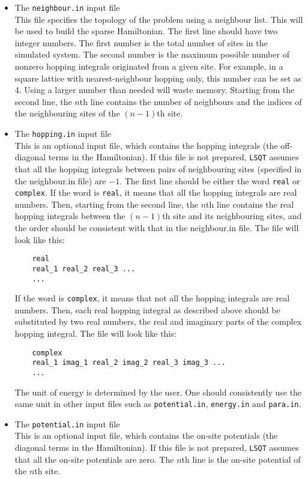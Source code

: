 \documentclass[12pt,a4paper]{report}
\begin{document}
\begin{itemize}
\item The \verb"neighbour.in" input file\\
This file specifies the topology of the problem using a neighbour list. This will be used to build the sparse Hamiltonian. The first line should have two integer numbers. The first number is the total number of sites in the simulated system. The second number is the maximum possible number of nonzero hopping integrals originated from a given site. For example, in a square lattice with nearest-neighbour hopping only, this number can be set as 4. Using a larger number than needed will waste memory. Starting from the second line, the $n$th line contains the number of neighbours and the indices of the neighbouring sites of the $(n-1)$th site.
\item The \verb"hopping.in" input file\\
This is an optional input file, which contains the hopping integrals (the off-diagonal terms in the Hamiltonian). If this file is not prepared, \verb"LSQT" assumes that all the hopping integrals between pairs of neighbouring sites (specified in the neighbour.in file) are $-1$. 
The first line should be either the word \verb"real" or \verb"complex".
If the word is \verb"real", it means that all the hopping integrals are real numbers. Then, starting from the second line, the $n$th line contains the real hopping integrals between the $(n-1)$th site and its neighbouring sites, and the order should be consistent with that in the neighbour.in file. The file will look like this:
\begin{verbatim}
    real
    real_1 real_2 real_3 ...
    ...
\end{verbatim}
If the word is \verb"complex", it means that not all the hopping integrals are real numbers. Then, each real hopping integral as described above should be substituted by two real numbers, the real and imaginary parts of the complex hopping integral. The file will look like this:
\begin{verbatim}
    complex
    real_1 imag_1 real_2 imag_2 real_3 imag_3 ...
    ...
\end{verbatim}
The unit of energy is determined by the user. One should consistently use the same unit in other input files such as \verb"potential.in", \verb"energy.in" and \verb"para.in".
\item The \verb"potential.in" input file\\
This is an optional input file, which contains the on-site potentials (the diagonal terms in the Hamiltonian). If this file is not prepared, \verb"LSQT" assumes that all the on-site potentials are zero. The $n$th line is the on-site potential of the $n$th site.

\end{itemize}
\end{document}
